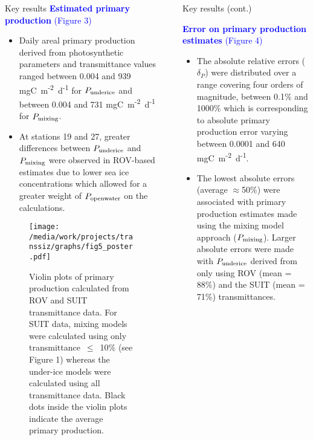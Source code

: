 \documentclass[final]{beamer}
\newlength{\sepwidth}
\newlength{\colwidth}
\newcommand{\separatorcolumn}{\begin{column}{\sepwidth}\end{column}}
\newcommand{\ppopenwater}{\ensuremath{P_{\text{\scriptsize openwater}}}}
\newcommand{\ppmixing}{\ensuremath{P_{\text{\scriptsize mixing}}}}
\newcommand{\ppunderice}{\ensuremath{P_{\text{\scriptsize underice}}}}
\newcommand{\dailypp}{mgC~m\textsuperscript{-2}~d\textsuperscript{-1}}
\begin{document}
\begin{frame}[t]
\begin{columns}[t]
\begin{column}{\colwidth}
\begin{block}{Key results}
				\textcolor{blue}{\large \textbf{Estimated primary production} (Figure 3)}
				\begin{itemize}
					\justifying
					\setlength\itemsep{1em}
					\item Daily areal primary production derived from photosynthetic parameters and transmittance values ranged between 0.004 and 939 \dailypp{} for \ppunderice{} and between 0.004 and 731 \dailypp{} for \ppmixing{}.
					\item At stations 19 and 27, greater differences between \ppunderice{} and \ppmixing{} were observed in ROV-based estimates due to lower sea ice concentrations which allowed for a greater weight of \ppopenwater{} on the calculations.
				\end{itemize}

				\begin{figure}
					\centering
					\texttt{[image: /media/work/projects/transsiz/graphs/fig5\_poster.pdf]}
					\caption{Violin plots of primary production calculated from ROV and SUIT transmittance data. For SUIT data, mixing models were calculated using only transmittance~$\le$~10\% (see Figure 1) whereas the under-ice models were calculated using all transmittance data. Black dots inside the violin plots indicate the average primary production.}
				\end{figure}

			\end{block}

		\end{column}

		\separatorcolumn

		\begin{column}{\colwidth}

			\begin{block}{Key results (cont.)}

				\textcolor{blue}{\large \textbf{Error on primary production estimates} (Figure 4)}

				\begin{itemize}
					\justifying
					\setlength\itemsep{1em}
					\item The absolute relative errors ($\delta_P$) were distributed over a range covering four orders of magnitude, between 0.1\% and 1000\% which is corresponding to absolute primary production error varying between 0.0001 and 640 \dailypp{}.
					\item The lowest absolute errors (average $\approx$50\%) were associated with primary production estimates made using the mixing model approach (\ppmixing{}). Larger absolute errors were made with \ppunderice{} derived from only using ROV (mean = 88\%) and the SUIT (mean = 71\%) transmittances.
				\end{itemize}


\end{block}
\end{column}
\end{columns}
\end{frame}
\end{document}
